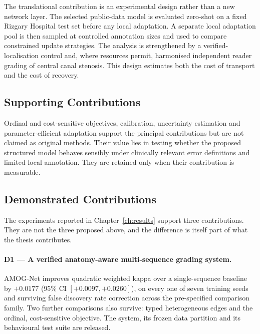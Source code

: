 The translational contribution is an experimental design rather than a new network
layer. The selected public-data model is evaluated zero-shot on a fixed Rizgary
Hospital test set before any local adaptation. A separate local adaptation pool is
then sampled at controlled annotation sizes and used to compare constrained update
strategies. The analysis is strengthened by a verified-localisation control and,
where resources permit, harmonised independent reader grading of central canal
stenosis. This design estimates both the cost of transport and the cost of recovery.

\subsection{Supporting Contributions}
\label{sec:intro-contrib-supporting}

Ordinal and cost-sensitive objectives, calibration, uncertainty estimation and
parameter-efficient adaptation support the principal contributions but are not
claimed as original methods. Their value lies in testing whether the proposed
structured model behaves sensibly under clinically relevant error definitions and
limited local annotation. They are retained only when their contribution is
measurable.

\subsection{Demonstrated Contributions}
\label{sec:intro-contrib-demonstrated}

The experiments reported in Chapter~\ref{ch:results} support three
contributions. They are not the three proposed above, and the difference is
itself part of what the thesis contributes.

\paragraph{D1 --- A verified anatomy-aware multi-sequence grading system.}
AMOG-Net improves quadratic weighted kappa over a single-sequence baseline by
$+0.0177$ (95\% CI $[+0.0097, +0.0260]$), on every one of seven training seeds
and surviving false discovery rate correction across the pre-specified
comparison family. Two further comparisons also survive: typed heterogeneous
edges and the ordinal, cost-sensitive objective. The system, its frozen data
partition and its behavioural test suite are released.

